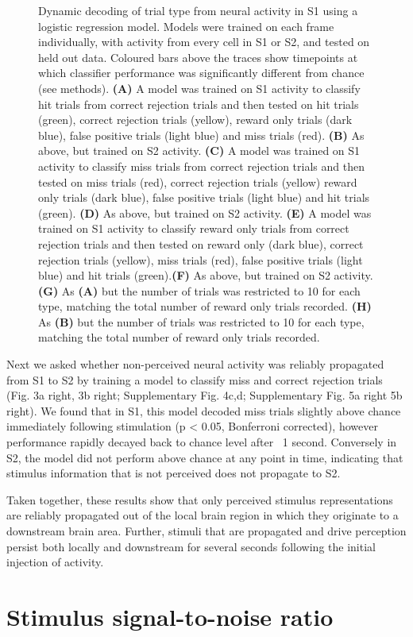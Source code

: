 \begin{figure}[h]
{Dynamic decoding of trial type from neural activity in S1 using a logistic regression model. Models were trained on each frame individually, with activity from every cell in S1 or S2, and tested on held out data. Coloured bars above the traces show timepoints at which classifier performance was significantly different from chance (see methods). \textbf{(A)} A model was trained on S1 activity to classify hit trials from correct rejection trials and then tested on hit trials (green), correct rejection trials (yellow), reward only trials (dark blue), false positive trials (light blue) and miss trials (red). \textbf{(B)} As above, but trained on S2 activity. \textbf{(C)} A model was trained on S1 activity to classify miss trials from correct rejection trials and then tested on miss trials (red), correct rejection trials (yellow) reward only trials (dark blue), false positive trials (light blue) and hit trials (green). \textbf{(D)} As above, but trained on S2 activity. \textbf{(E)} A model was trained on S1 activity to classify reward only trials from correct rejection trials and then tested on reward only (dark blue), correct rejection trials (yellow), miss trials (red), false positive trials (light blue) and hit trials (green).\textbf{(F)} As above, but trained on S2 activity. \textbf{(G)} As \textbf{(A)} but the number of trials was restricted to 10 for each type, matching the total number of reward only trials recorded. \textbf{(H)} As \textbf{(B)} but the number of trials was restricted to 10 for each type, matching the total number of reward only trials recorded.
} 
\label{fig:supp4}
\end{figure}

Next we asked whether non-perceived neural activity was reliably propagated from S1 to S2 by training a model to classify miss and correct rejection trials (Fig. 3a right, 3b right; Supplementary Fig. 4c,d; Supplementary Fig. 5a right 5b right). We found that in S1, this model decoded miss trials slightly above chance immediately following stimulation (p < 0.05, Bonferroni corrected), however performance rapidly decayed back to chance level after ~1 second. Conversely in S2, the model did not perform above chance at any point in time, indicating that stimulus information that is not perceived does not propagate to S2.








Taken together, these results show that only perceived stimulus representations are reliably propagated out of the local brain region in which they originate to a downstream brain area. Further, stimuli that are propagated and drive perception persist both locally and downstream for several seconds following the initial injection of activity.
















\section{Stimulus signal-to-noise ratio}

